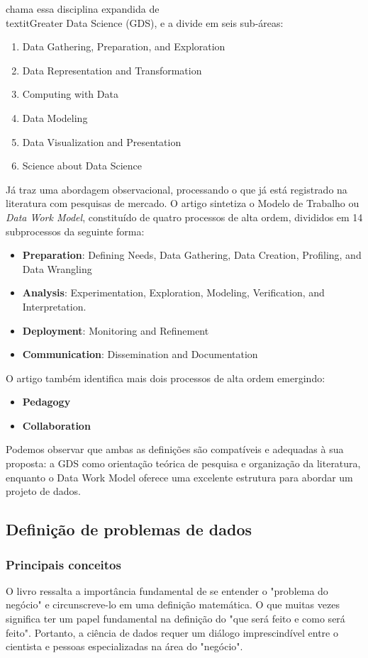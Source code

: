 \cite{DONOHO} chama essa disciplina expandida de \\textit{Greater Data Science (GDS)}, e a divide em seis sub-áreas:
\begin{enumerate}
\item Data Gathering, Preparation, and Exploration
\item Data Representation and Transformation
\item Computing with Data
\item Data Modeling 
\item Data Visualization and Presentation
\item Science about Data Science

\end{enumerate}
Já \cite{BATON} traz uma abordagem observacional, processando o que já está registrado na literatura com pesquisas de mercado. O artigo sintetiza o Modelo de Trabalho ou \emph{Data Work Model}, constituído de quatro processos de alta ordem, divididos em 14 subprocessos da seguinte forma:
\begin{itemize}
\item \textbf{Preparation}: Defining Needs, Data Gathering, Data Creation, Profiling, and Data Wrangling
\item \textbf{Analysis}: Experimentation, Exploration, Modeling, Verification, and Interpretation.
\item \textbf{Deployment}: Monitoring and Refinement
\item \textbf{Communication}: Dissemination and Documentation
\end{itemize}

O artigo também identifica mais dois processos de alta ordem emergindo:
\begin{itemize}
\item \textbf{Pedagogy} 
\item \textbf{Collaboration}
\end{itemize}

Podemos observar que ambas as definições são compatíveis e adequadas à sua proposta: a GDS \cite{DONOHO} como orientação teórica de pesquisa e organização da literatura, enquanto o Data Work Model \cite{BATON} oferece uma excelente estrutura para abordar um projeto de dados. 

\subsection{Definição de problemas de dados}
\subsubsection{Principais conceitos}\label{principais.conceitos}
 O livro \cite{DATAPYTHON} ressalta a importância fundamental de se entender o "problema do negócio" e circunscreve-lo em uma definição matemática. O que muitas vezes significa ter um papel fundamental na definição do "que será feito e como será feito". Portanto, a ciência de dados requer um diálogo imprescindível entre o cientista e pessoas especializadas na área do "negócio".
 
